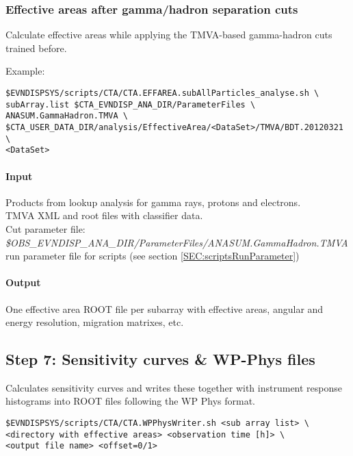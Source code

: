 \documentclass[titlepage,a4paper,twoside,11pt]{report}
\begin{document}
\subsubsection{Effective areas after gamma/hadron separation cuts}

Calculate effective areas while applying the TMVA-based gamma-hadron cuts
trained before.

Example:

\begin{lstlisting}
$EVNDISPSYS/scripts/CTA/CTA.EFFAREA.subAllParticles_analyse.sh \
subArray.list $CTA_EVNDISP_ANA_DIR/ParameterFiles \
ANASUM.GammaHadron.TMVA \
$CTA_USER_DATA_DIR/analysis/EffectiveArea/<DataSet>/TMVA/BDT.20120321 \
<DataSet> 
\end{lstlisting}

\paragraph{Input}
Products from lookup analysis for gamma rays, protons and electrons. \\
TMVA XML and root files with classifier data. \\
Cut parameter file: \\
{\it \$OBS\_EVNDISP\_ANA\_DIR/ParameterFiles/ANASUM.GammaHadron.TMVA}\\
run parameter file for scripts (see section \ref{SEC:scriptsRunParameter})

\paragraph{Output}
One effective area ROOT file per subarray with effective areas, angular and energy resolution, migration matrixes, etc.

\subsection{Step 7: Sensitivity curves \& WP-Phys files}

Calculates sensitivity curves and writes these together with instrument response histograms into ROOT files following the WP Phys format.

\begin{lstlisting}
$EVNDISPSYS/scripts/CTA/CTA.WPPhysWriter.sh <sub array list> \
<directory with effective areas> <observation time [h]> \
<output file name> <offset=0/1>
\end{lstlisting}
\end{document}
